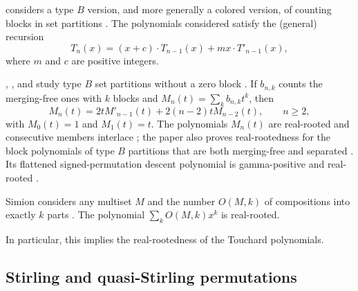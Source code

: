 \begin{example*}

 considers a type $B$ version, and more generally a colored
version, of counting blocks in set partitions \cite{Wang2014}.
The polynomials considered satisfy the (general) recursion
\[
  T_n(x) = (x+c) \cdot  T_{n-1}(x) + mx\cdot T'_{n-1}(x),
\]
where $m$ and $c$ are positive integers.

, , and 
study type $B$ set partitions without a zero block
\cite{AlexanderssonBeyeneMantaci2026x}.  If $b_{n,k}$ counts the
merging-free ones with $k$ blocks and
$M_n(t)=\sum_k b_{n,k}t^k$, then
\[
 M_n(t)=2tM'_{n-1}(t)+2(n-2)tM_{n-2}(t),\qquad n\geq2,
\]
with $M_0(t)=1$ and $M_1(t)=t$.
The polynomials $M_n(t)$ are real-rooted and consecutive members interlace
\cite[Prop.~27 and Cor.~28]{AlexanderssonBeyeneMantaci2026x};
the paper also proves real-rootedness for the block polynomials of type $B$
partitions that are both merging-free and separated
\cite[Thm.~33]{AlexanderssonBeyeneMantaci2026x}.
Its flattened signed-permutation descent polynomial is gamma-positive and
real-rooted \cite[Thm.~59 and Cor.~60]{AlexanderssonBeyeneMantaci2026x}.

\end{example*}


\begin{example*}
Simion considers any multiset $M$ and the number $O(M,k)$ of compositions into
exactly $k$ parts \cite{Simion1984}.  The polynomial
$\sum_k O(M,k)x^k$ is real-rooted.

In particular, this implies the real-rootedness of the Touchard polynomials.
\end{example*}


\subsection[sturmOther]{Stirling and quasi-Stirling permutations}


